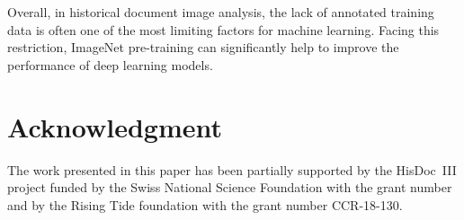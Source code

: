 \documentclass[journal]{IEEEtran}
\newcommand{\af}[1]{{\color{black}#1}}
\newcommand{\lsn}[1]{{\color{orange}#1}}
\begin{document}
\af{Overall,} in historical document image analysis, the lack of annotated training data is often one of the most limiting factors for machine learning.
Facing this restriction, ImageNet pre-training can significantly help to improve the performance of deep learning models.

\lsn{} 
\section*{Acknowledgment}
The work presented in this paper has been partially supported by the HisDoc~III project funded by the Swiss National Science Foundation with the grant number \textunderscore and by the Rising Tide foundation with the grant number CCR-18-130.



\end{document}
